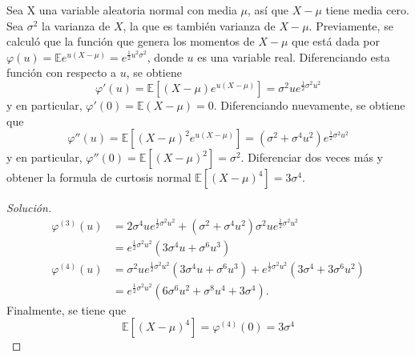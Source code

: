 \documentclass[11pt,notitlepage]{article}
\newenvironment{solucion}
  {\begin{proof}[Solución]}
  {\end{proof}}
\begin{document}
Sea X una variable aleatoria normal con media $\mu$, así que $X-\mu$ tiene media cero. Sea $\sigma^{2}$ la varianza de $X$, la que es también varianza de $X-\mu$. Previamente, se calculó que la función que genera los momentos de $X-\mu$ que está dada por $\varphi(u)=\mathbb{E}e^{u(X-\mu)}=e^{\frac{1}{2}u^{2}\sigma^{2}}$, donde $u$ es una variable real. Diferenciando esta función con respecto a $u$, se obtiene
\begin{equation*}
    \varphi'(u)=\mathbb{E}\left[ (X-\mu)e^{u(X-\mu)} \right]=\sigma^{2}ue^{\frac{1}{2}\sigma^{2}u^{2}}
\end{equation*}
\hspace{0.3cm} y en particular, $\varphi'(0)=\mathbb{E}(X-\mu)=0$. Diferenciando nuevamente, se obtiene que
\begin{equation*}
    \varphi''(u)=\mathbb{E}\left[ (X-\mu)^{2}e^{u(X-\mu)} \right]=(\sigma^{2}+\sigma^{4}u^{2})e^{\frac{1}{2}\sigma^{2}u^{2}}
\end{equation*}
\hspace{0.3cm} y en particular, $\varphi''(0)=\mathbb{E}[(X-\mu)^{2}]=\sigma^{2}$. Diferenciar dos veces más y obtener la formula de curtosis normal $\mathbb{E}[(X-\mu)^{4}]=3\sigma^{4}$.

\begin{solucion}

\begin{align*}
    \varphi^{(3)}(u)&=2\sigma^{4}ue^{\frac{1}{2}\sigma^{2}u^{2}}+(\sigma^{2}+\sigma^{4}u^{2})\sigma^{2}ue^{\frac{1}{2}\sigma^{2}u^{2}} \\
    &=e^{\frac{1}{2}\sigma^{2}u^{2}}(3\sigma^{4}u+\sigma^{6}u^{3}) \\
    \varphi^{(4)}(u)&=\sigma^{2}ue^{\frac{1}{2}\sigma^{2}u^{2}}(3\sigma^{4}u+\sigma^{6}u^{3})+e^{\frac{1}{2}\sigma^{2}u^{2}}(3\sigma^{4}+3\sigma^{6}u^{2})\\
    &=e^{\frac{1}{2}\sigma^{2}u^{2}}(6\sigma^{6}u^{2}+\sigma^{8}u^{4}+3\sigma^{4}).
\end{align*}
\hspace{0.3cm} Finalmente, se tiene que
\begin{equation*}
    \mathbb{E}[(X-\mu)^{4}]=\varphi^{(4)}(0)=3\sigma^{4}
\end{equation*}
\end{solucion}
\end{document}
